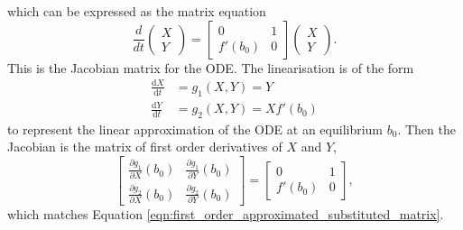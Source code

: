 \documentclass{article}
\begin{document}
which can be expressed as the matrix equation
\begin{equation}
    \frac{d}{dt}\begin{pmatrix}
        X \\
        Y
    \end{pmatrix} = \begin{bmatrix}
        0      & 1 \\
        f'(b_0) & 0
    \end{bmatrix} \begin{pmatrix}
        X \\
        Y
    \end{pmatrix}.
    \label{eqn:first_order_approximated_substituted_matrix}
\end{equation}
This is the Jacobian matrix for the ODE. The linearisation is of the form
\begin{align*}
    \frac{\mathrm{d}X}{\mathrm{d}t} &= g_1(X,Y) = Y \\
    \frac{\mathrm{d}Y}{\mathrm{d}t} &= g_2(X,Y) = Xf'(b_0) 
\end{align*}
to represent the linear approximation of the ODE at an equilibrium \(b_0\).
Then the Jacobian is the matrix of first order derivatives of $X$ and $Y$,
\begin{equation}
    \begin{bmatrix}
        \frac{\partial g_1}{\partial X}(b_0) & \frac{\partial g_1}{\partial Y}(b_0) \\
        \frac{\partial g_2}{\partial X}(b_0) & \frac{\partial g_2}{\partial Y}(b_0) 
    \end{bmatrix} = \begin{bmatrix}
        0 & 1 \\
        f'(b_0) & 0
    \end{bmatrix},
\end{equation}
which matches Equation \ref{eqn:first_order_approximated_substituted_matrix}.


\end{document}
